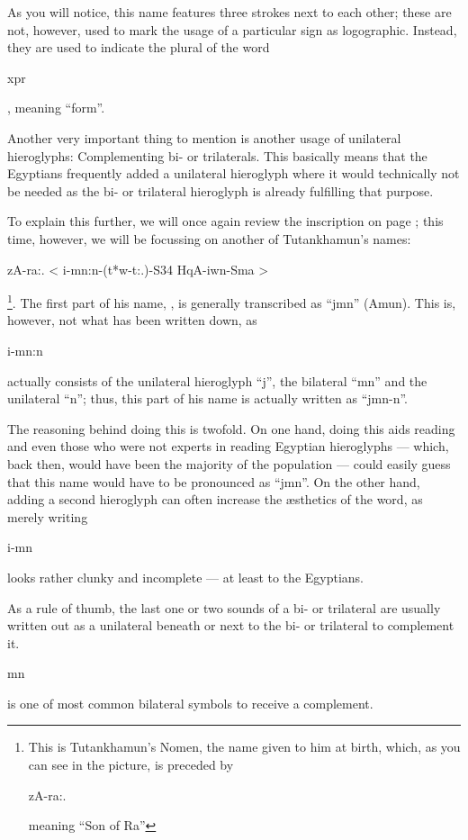 \documentclass[a5paper,twoside,11pt]{report}
\begin{document}
		As you will notice, this name features three strokes next to each other; these are not, however, used to mark the usage of a particular sign as logographic. Instead, they are used to indicate the plural of the word \begin{hieroglyph}xpr\end{hieroglyph}, meaning “form”. 

		Another very important thing to mention is another usage of unilateral hieroglyphs: Complementing bi- or trilaterals. This basically means that the Egyptians frequently added a unilateral hieroglyph where it would technically not be needed as the bi- or trilateral hieroglyph is already fulfilling that purpose.

		To explain this further, we will once again review the inscription on page \pageref{fig:1}; this time, however, we will be focussing on another of Tutankhamun’s names: \begin{hieroglyph}zA-\!\!ra:. < i-mn:n-(t*w-\!t:.)-S34 HqA-iwn-Sma >\end{hieroglyph}\footnote{This is Tutankhamun’s Nomen, the name given to him at birth, which, as you can see in the picture, is preceded by \begin{hieroglyph}zA-\!\!ra:.\end{hieroglyph} meaning “Son of Ra”}. The first part of his name, , is generally transcribed as “jmn” (Amun). This is, however, not what has been written down, as \begin{hieroglyph}i-mn:n\end{hieroglyph} actually consists of the unilateral hieroglyph “j”, the bilateral “mn” and the unilateral “n”; thus, this part of his name is actually written as “jmn-n”.

		The reasoning behind doing this is twofold. On one hand, doing this aids reading and even those who were not experts in reading Egyptian hieroglyphs — which, back then, would have been the majority of the population — could easily guess that this name would have to be pronounced as “jmn”. On the other hand, adding a second hieroglyph can often increase the æsthetics of the word, as merely writing \begin{hieroglyph}i-mn\end{hieroglyph} looks rather clunky and incomplete — at least to the Egyptians.

		As a rule of thumb, the last one or two sounds of a bi- or trilateral are usually written out as a unilateral beneath or next to the bi- or trilateral to complement it.\begin{hieroglyph}mn\end{hieroglyph} is one of most common bilateral symbols to receive a complement.
\end{document}
